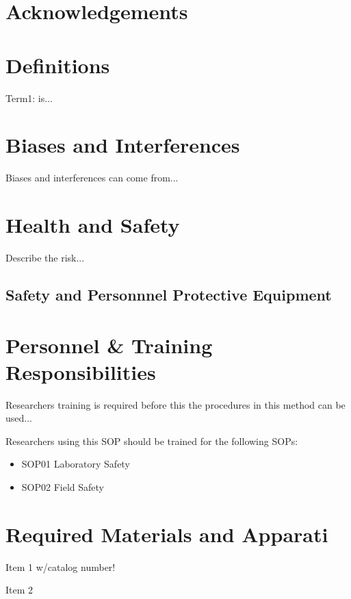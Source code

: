 \documentclass[12pt]{../SOP4_alpha}\usepackage[]{graphicx}\usepackage[]{xcolor}
\begin{document}
\tableofcontents

\newpage

\section{Acknowledgements}

\section{Definitions}

\NP Term1: is...

\section{Biases and Interferences}

\NP Biases and interferences can come from...

\section{Health and Safety}

\NP Describe the risk...


\subsection{Safety and Personnnel Protective Equipment}


\section{Personnel \& Training Responsibilities}

\NP Researchers training is required before this the procedures in this method can be used... 

\NP Researchers using this SOP should be trained for the following SOPs:

\begin{itemize}
  \item SOP01 Laboratory Safety
  \item SOP02 Field Safety
\end{itemize}

\section{Required Materials and Apparati}

\NP Item 1 w/catalog number!

\NP Item 2
\end{document}
